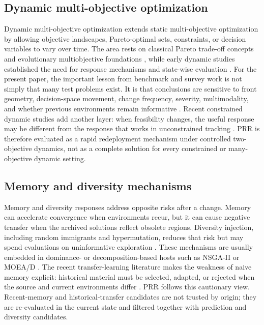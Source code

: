 \documentclass[1p,times]{elsarticle}
\begin{document}
\subsection{Dynamic multi-objective optimization}
Dynamic multi-objective optimization extends static multi-objective optimization by allowing objective landscapes, Pareto-optimal sets, constraints, or decision variables to vary over time. The area rests on classical Pareto trade-off concepts and evolutionary multiobjective foundations \cite{miettinen1999,deb2001,coello2007}, while early dynamic studies established the need for response mechanisms and state-wise evaluation \cite{branke2002,farina2004,nguyen2012}. For the present paper, the important lesson from benchmark and survey work is not simply that many test problems exist. It is that conclusions are sensitive to front geometry, decision-space movement, change frequency, severity, multimodality, and whether previous environments remain informative \cite{huband2006,li2009,helbig2014,benchmark2022xiang}. Recent constrained dynamic studies add another layer: when feasibility changes, the useful response may be different from the response that works in unconstrained tracking \cite{constrained2023dvc,asoc2024acrm,constrained2026dualpred,fgsp2025}. PRR is therefore evaluated as a rapid redeployment mechanism under controlled two-objective dynamics, not as a complete solution for every constrained or many-objective dynamic setting.

\subsection{Memory and diversity mechanisms}
Memory and diversity responses address opposite risks after a change. Memory can accelerate convergence when environments recur, but it can cause negative transfer when the archived solutions reflect obsolete regions. Diversity injection, including random immigrants and hypermutation, reduces that risk but may spend evaluations on uninformative exploration \cite{yang2008,nguyen2012}. These mechanisms are usually embedded in dominance- or decomposition-based hosts such as NSGA-II or MOEA/D \cite{deb2002,zhang2007,trivedi2017}. The recent transfer-learning literature makes the weakness of naive memory explicit: historical material must be selected, adapted, or rejected when the source and current environments differ \cite{mstl2022,domain2022,wu2023kt,li2024nitl,song2024mst,osbitp2025}. PRR follows this cautionary view. Recent-memory and historical-transfer candidates are not trusted by origin; they are re-evaluated in the current state and filtered together with prediction and diversity candidates.
\end{document}
